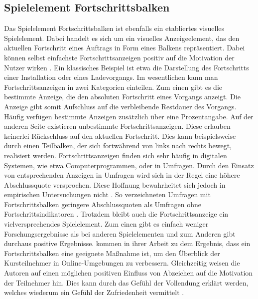 \subsection{Spielelement Fortschrittsbalken}\label{progressbar}
Das Spielelement Fortschrittsbalken ist ebenfalls ein etabliertes visuelles Spielelement.
Dabei handelt es sich um ein visuelles Anzeigeelement, das den aktuellen Fortschritt eines Auftrags in Form eines Balkens repräsentiert. Dabei können selbst einfachste Fortschrittsanzeigen positiv auf die Motivation der Nutzer wirken \cite{mazarakis2018gamification}. Ein klassisches Beispiel ist etwa die Darstellung des Fortschritts einer Installation oder eines Ladevorgangs. Im wesentlichen kann man Fortschrittsanzeigen in zwei Kategorien einteilen. Zum einen gibt es die bestimmte Anzeige, die den absoluten Fortschritt eines Vorgangs anzeigt. Die Anzeige gibt somit Aufschluss auf die verbleibende Restdauer des Vorgangs. Häufig verfügen bestimmte Anzeigen zusätzlich über eine Prozentangabe. Auf der anderen Seite existieren unbestimmte Fortschrittsanzeigen. Diese erlauben keinerlei Rückschluss auf den aktuellen Fortschritt. Dies kann beispielsweise durch einen Teilbalken, der sich fortwährend von links nach rechts bewegt, realisiert werden. Fortschrittsanzeigen finden sich sehr häufig in digitalen Systemen, wie etwa Computerprogrammen, oder in Umfragen. Durch den Einsatz von entsprechenden Anzeigen in Umfragen wird sich in der Regel eine höhere Abschlussquote versprochen. Diese Hoffnung bewahrheitet sich jedoch in empirischen Untersuchungen nicht \cite{Heerwegh}. So verzeichneten Umfragen mit Fortschrittsbalken geringere Abschlussquoten als Umfragen ohne Fortschrittsindikatoren \cite{liu_examining_2017}. Trotzdem bleibt auch die Fortschrittsanzeige ein vielversprechendes Spielelement. Zum einen gibt es einfach weniger Forschungsergebnisse als bei anderen Spielelementen \cite{koivisto_rise_2019} und zum Anderen gibt durchaus positive Ergebnisse.  kommen in ihrer Arbeit zu dem Ergebnis, dass ein Fortschrittsbalken eine geeignete Maßnahme ist, um den Überblick der Kursteilnehmer in Online-Umgebungen zu verbessern. Gleichzeitig weisen die Autoren auf einen möglichen positiven Einfluss von Abzeichen auf die Motivation der Teilnehmer hin. Dies kann durch das Gefühl der Vollendung erklärt werden, welches wiederum ein Gefühl der Zufriedenheit vermittelt \cite{ryan_deci_2000}.

